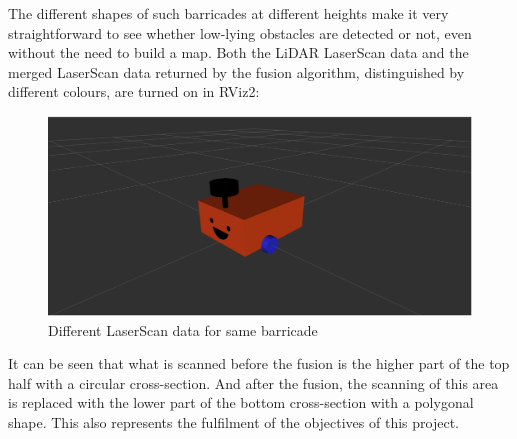 The different shapes of such barricades at different heights make it very straightforward 
to see whether low-lying obstacles are detected or not, 
even without the need to build a map. 
Both the LiDAR LaserScan data and the merged LaserScan data returned by the fusion algorithm, 
distinguished by different colours, are turned on in RViz2:
\begin{figure}[H]
    \centering
    \includegraphics[width=0.8\linewidth]{figs/robot.png}
    \caption{Different LaserScan data for same barricade}
\end{figure}
It can be seen that what is scanned before the fusion 
is the higher part of the top half with a circular cross-section.
And after the fusion, the scanning of this area is replaced with the lower part of the bottom cross-section 
with a polygonal shape. This also represents the fulfilment of the objectives of this project.




